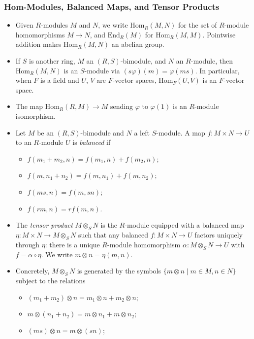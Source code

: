 \documentclass[../Odyssey_Project.tex]{subfiles}
\begin{document}
\subsubsection*{Hom-Modules, Balanced Maps, and Tensor Products}
\begin{itemize}
    \item Given $R$-modules $M$ and $N$, we write $\mathrm{Hom}_R(M, N)$ for the set of $R$-module homomorphisms $M \to N$, and $\mathrm{End}_R(M)$ for $\mathrm{Hom}_R(M, M)$. Pointwise addition makes $\mathrm{Hom}_R(M, N)$ an abelian group.
    \item If $S$ is another ring, $M$ an $(R,S)$-bimodule, and $N$ an $R$-module, then $\mathrm{Hom}_R(M, N)$ is an $S$-module via $(s\varphi)(m) = \varphi(ms)$. In particular, when $F$ is a field and $U$, $V$ are $F$-vector spaces, $\mathrm{Hom}_F(U, V)$ is an $F$-vector space.
    \item The map $\mathrm{Hom}_R(R, M) \to M$ sending $\varphi$ to $\varphi(1)$ is an $R$-module isomorphism.
    \item Let $M$ be an $(R,S)$-bimodule and $N$ a left $S$-module. A map $f \colon M \times N \to U$ to an $R$-module $U$ is \emph{balanced} if
    \begin{itemize}
        \item $f(m_1 + m_2, n) = f(m_1, n) + f(m_2, n)$;
        \item $f(m, n_1 + n_2) = f(m, n_1) + f(m, n_2)$;
        \item $f(ms, n) = f(m, sn)$;
        \item $f(rm, n) = rf(m, n)$.
    \end{itemize}
    \item The \emph{tensor product} $M \otimes_S N$ is the $R$-module equipped with a balanced map $\eta \colon M \times N \to M \otimes_S N$ such that any balanced $f \colon M \times N \to U$ factors uniquely through $\eta$: there is a unique $R$-module homomorphism $\alpha \colon M \otimes_S N \to U$ with $f = \alpha \circ \eta$. We write $m \otimes n = \eta(m, n)$.
    \item Concretely, $M \otimes_S N$ is generated by the symbols $\{m \otimes n \mid m \in M, n \in N\}$ subject to the relations
    \begin{itemize}
        \item $(m_1 + m_2) \otimes n = m_1 \otimes n + m_2 \otimes n$;
        \item $m \otimes (n_1 + n_2) = m \otimes n_1 + m \otimes n_2$;
        \item $(ms) \otimes n = m \otimes (sn)$;

\end{itemize}
\end{itemize}
\end{document}
